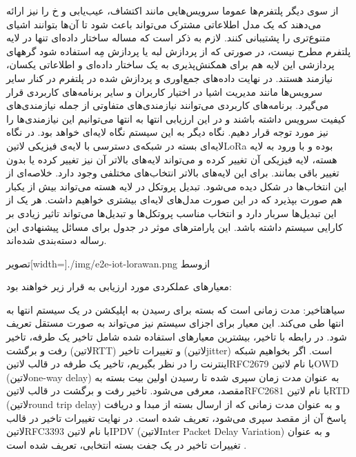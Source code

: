 از سوی دیگر پلتفرم‌ها عموما سرویس‌هایی مانند اکتشاف، عیب‌یابی و ‌خ را نیز ارائه می‌دهند که یک مدل اطلاعاتی مشترک می‌تواند باعث شود تا آن‌ها
بتوانند اشیای متنوع‌تری را پشتیبانی کنند.
لازم به ذکر است که مساله ساختار داده‌ای تنها در لایه پلتفرم مطرح نیست، در صورتی که از پردازش لبه یا پردازش مِه استفاده شود گرههای پردازشی این لایه
هم برای همکنش‌پذیری به یک ساختار داده‌ای و اطلاعاتی یکسان، نیازمند هستند.
در نهایت داده‌های جمع‌اوری و پردازش شده در پلتفرم در کنار سایر سرویس‌ها مانند مدیریت اشیا در اختیار کاربران و سایر برنامه‌های کاربردی قرار می‌گیرد.
برنامه‌های کاربردی می‌توانند نیازمندی‌های متفاوتی از جمله نیازمندی‌های کیفیت سرویس داشته باشند و در این ارزیابی انتها به انتها می‌توانیم این نیازمندی‌ها را
نیز مورد توجه قرار دهیم.
نگاه دیگر به این سیستم نگاه لایه‌ای خواهد بود. در نگاه لایه‌ای بسته در شبکه‌ی دسترسی با لایه‌ی فیزیکی ‌لاتین{LoRa} بوده و با ورود به لایه هسته،
لایه فیزیکی آن تغییر کرده و می‌تواند لایه‌های بالاتر آن نیز تغییر کرده یا بدون تغییر باقی بمانند. برای این لایه‌های بالاتر انتخاب‌های مختلفی وجود دارد.
خلاصه‌ای از این انتخاب‌ها در شکل  دیده می‌شود.
تبدیل پروتکل در لایه هسته می‌تواند بیش از یکبار هم صورت بپذیرد که در این صورت مدل‌های لایه‌ای بیشتری خواهیم داشت. هر یک از این تبدیل‌ها
سربار دارد و انتخاب مناسب پروتکل‌ها و تبدیل‌ها می‌تواند تاثیر زیادی بر کارایی سیستم داشته باشد.
این پارامترهای موثر در جدول  برای مسائل پیشنهادی این رساله دسته‌بندی شده‌اند.

‌تصویر[width=\textwidth]{./img/e2e-iot-lorawan.png}
‌ازوسط

معیار‌های عملکردی مورد ارزیابی به قرار زیر خواهند بود:


 ‌سیاه{تاخیر}: مدت زمانی است که بسته برای رسیدن به اپلیکشن در یک سیستم انتها به انتها طی می‌کند. این معیار برای
اجزای سیستم نیز می‌تواند به صورت مستقل تعریف شود.
در رابطه با تاخیر، بیشترین معیارهای استفاده شده شامل تاخیر یک طرفه، تاخیر رفت و برگشت (‌لاتین{RTT}) و تغییرات تاخیر (‌لاتین{jitter}) است.
اگر بخواهیم شبکه اینترنت را در نظر بگیریم، تاخیر یک طرفه در قالب ‌لاتین{RFC2679} با نام ‌لاتین{OWD} (‌لاتین{one-way delay}) به عنوان مدت زمان
سپری شده تا رسیدن اولین بیت بسته به مقصد،
معرفی می‌شود. تاخیر رفت و برگشت در قالب ‌لاتین{RFC2681} با نام ‌لاتین{RTD} (‌لاتین{round trip delay}) و به عنوان مدت زمانی
که از ارسال بسته از مبدا و دریافت پاسخ آن از مقصد سپری می‌شود، تعریف شده است.
در نهایت تغییرات تاخیر در قالب ‌لاتین{RFC3393} با نام ‌لاتین{IPDV} (‌لاتین{Inter Packet Delay Variation}) و به عنوان
تغییرات تاخیر در یک جفت بسته انتخابی، تعریف شده است
.


